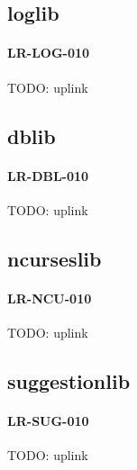 \subsection{log\textunderscore lib}
\paragraph{LR-LOG-010}
TODO: uplink

\subsection{db\textunderscore lib}
\paragraph{LR-DBL-010}
TODO: uplink

\subsection{ncurses\textunderscore lib}
\paragraph{LR-NCU-010}
TODO: uplink

\subsection{suggestion\textunderscore lib}
\paragraph{LR-SUG-010}
TODO: uplink
